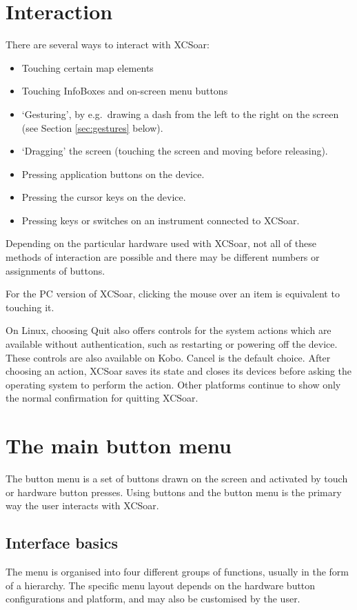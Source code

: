\section{Interaction}
There are several ways to interact with XCSoar:
\begin{itemize}
\item Touching certain map elements
\item Touching InfoBoxes and on-screen menu buttons
\item `Gesturing', by e.g.\ drawing a dash from the left to the right
  on the screen (see Section \ref{sec:gestures} below).
\item `Dragging' the screen (touching the screen and moving before releasing).
\item Pressing application buttons on the device.
\item Pressing the cursor keys on the device.
\item Pressing keys or switches on an instrument connected to XCSoar.
\end{itemize}
Depending on the particular hardware used with XCSoar, not all of these methods
of interaction are possible and there may be different numbers or assignments
of buttons.

For the PC version of XCSoar, clicking the mouse over an item is equivalent to
touching it.

On Linux, choosing Quit also offers controls for the system actions which are
available without authentication, such as restarting or powering off the
device.  These controls are also available on Kobo.  Cancel is the default
choice.  After choosing an action, XCSoar saves its state and closes its devices
before asking the operating system to perform the action.  Other platforms
continue to show only the normal confirmation for quitting XCSoar.

\section{The main button menu}
The button menu is a set of buttons drawn on the screen and activated by touch
or hardware button presses.  Using buttons and the button menu is the primary
way the user interacts with XCSoar.

\subsection*{Interface basics}
The menu is organised into four different groups of functions, usually in
the form of a hierarchy.  The specific menu layout depends on the
hardware button configurations and platform, and may also be customised by the
user.

